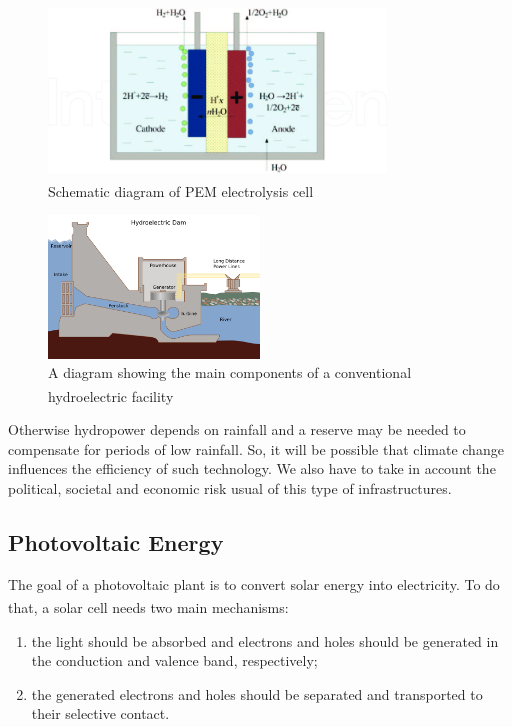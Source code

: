 \begin{figure}[p]
    \centering
    \includegraphics[width=0.8\textwidth]{Chapters/Pictures/Schematic-diagram-of-PEM-electrolysis-cell-33.png}
    \caption{Schematic diagram of PEM electrolysis cell\textsuperscript{\cite{schemepictureelectrolysis}}}
    \label{fig:pem}
\end{figure}

\begin{figure}[p]
    \centering
    \includegraphics[width=0.5\textwidth]{Chapters/Pictures/Damparts.png}
    \caption{\small{A diagram showing the main components of a conventional hydroelectric facility\textsuperscript{\cite{hydropowerscheme}}}}
    \label{fig:dam}
\end{figure}

Otherwise hydropower depends on rainfall and a reserve may be needed to compensate for periods of low rainfall. So, it will be possible that climate change influences the efficiency of such technology. We also have to take in account the political, societal and economic risk usual of this type of infrastructures.

\subsection{Photovoltaic Energy}
The goal of a photovoltaic plant is to convert solar energy into electricity. To do that, a solar cell needs two main mechanisms\textsuperscript{\cite{PV2020}}:

\begin{enumerate}
    \item the light should be absorbed and electrons and holes should be generated in the conduction and valence band, respectively;
    \item the generated electrons and holes should be separated and transported to their selective contact.
\end{enumerate}

